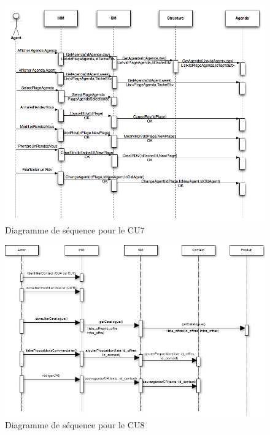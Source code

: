 \begin{figure}[H]
	\begin{center}
		\includegraphics[scale=0.4]{Includes/SOA-Sequence-CU7.png}
		\caption{Diagramme de séquence pour le CU7}
	\end{center}
\end{figure}

\begin{figure}[H]
	\begin{center}
		\includegraphics[scale=0.4]{Includes/SOA-Sequence-CU8.png}
		\caption{Diagramme de séquence pour le CU8}
	\end{center}
\end{figure}

